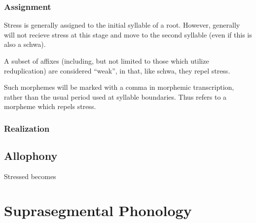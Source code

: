 \subsection{Assignment}
Stress is generally assigned to the initial syllable of a root. However,  generally will not recieve stress at this stage and move to the second syllable (even if this is also a schwa).

A subset of affixes (including, but not limited to those which utilize reduplication) are considered ``weak'', in that, like schwa, they repel stress.

Such morphemes will be marked with a comma in morphemic transcription, rather than the usual period used at syllable boundaries. Thus  refers to a morpheme  which repels stress.

\subsection{Realization}

\section{Allophony}
Stressed  becomes 


\chapter{Suprasegmental Phonology}
